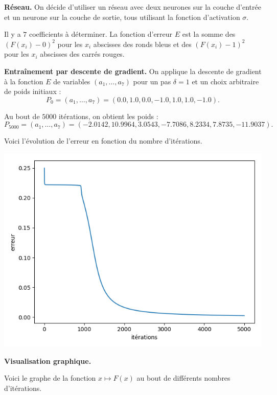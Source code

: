 \bigskip

\textbf{Réseau.}
On décide d'utiliser un réseau avec deux neurones sur la couche d'entrée et un neurone sur la couche de sortie, tous utilisant la fonction d'activation $\sigma$.


Il y a $7$ coefficients à déterminer.
La fonction d'erreur $E$ est la somme des $(F(x_i)-0)^2$ pour les $x_i$ abscisses des ronds bleus et des $(F(x_i)-1)^2$ pour les $x_i$ abscisses des carrés rouges.

\bigskip

\textbf{Entraînement par descente de gradient.}
On applique la descente de gradient à la fonction $E$ de variables $(a_1,\ldots,a_7)$ pour un pas $\delta = 1$ et un choix arbitraire de poids initiaux :
$$P_0 = (a_1,\ldots,a_7) = (0.0, 1.0, 0.0, -1.0, 1.0, 1.0, -1.0).$$

Au bout de $5000$ itérations, on obtient les poids :
$$P_{5000} = (a_1,\ldots,a_7) = (-2.0142, 10.9964, 3.0543, -7.7086, 8.2334, 7.8735, -11.9037).$$


Voici l'évolution de l'erreur en fonction du nombre d'itérations.
\begin{center}
	\includegraphics[scale=\myscale,scale=0.5]{figures/retro_03_f}
\end{center}


\bigskip

\textbf{Visualisation graphique.}

Voici le graphe de la fonction $x \mapsto F(x)$ au bout de différents nombres d'itérations.

